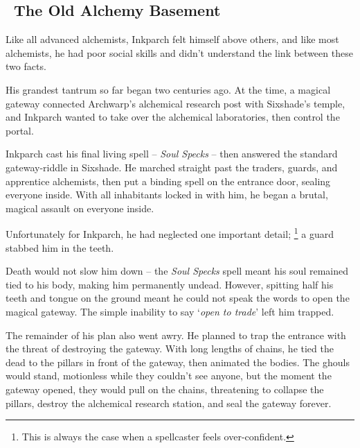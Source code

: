 \subsection[The Old Alchemy Basement]{~The Old Alchemy Basement~}
\label{old_alchemy_basement}


\begin{exampletext}
  Like all advanced alchemists, Inkparch felt himself above others, and like most alchemists, he had poor social skills and didn't understand the link between these two facts.

  His grandest tantrum so far began two centuries ago.
  At the time, a magical gateway connected Archwarp's alchemical research post with Sixshade's temple, and Inkparch wanted to take over the alchemical laboratories, then control the portal.

  Inkparch cast his final living spell -- \textit{Soul Specks} -- then answered the standard gateway-riddle in Sixshade.
  He marched straight past the traders, guards, and apprentice alchemists, then put a binding spell on the entrance door, sealing everyone inside.
  With all inhabitants locked in with him, he began a brutal, magical assault on everyone inside.

  Unfortunately for Inkparch, he had neglected one important detail;%
  \footnote{This is always the case when a spellcaster feels over-confident.}
  a guard stabbed him in the teeth.

  Death would not slow him down -- the \textit{Soul Specks} spell meant his soul remained tied to his body, making him permanently undead.
  However, spitting half his teeth and tongue on the ground meant he could not speak the words to open the magical gateway.
  The simple inability to say `\textit{open to trade}' left him trapped.

  The remainder of his plan also went awry.
  He planned to trap the entrance with the threat of destroying the gateway.
  With long lengths of chains, he tied the dead to the pillars in front of the gateway, then animated the bodies.
  The ghouls would stand, motionless while they couldn't see anyone, but the moment the gateway opened, they would pull on the chains, threatening to collapse the pillars, destroy the alchemical research station, and seal the gateway forever.


\end{exampletext}
